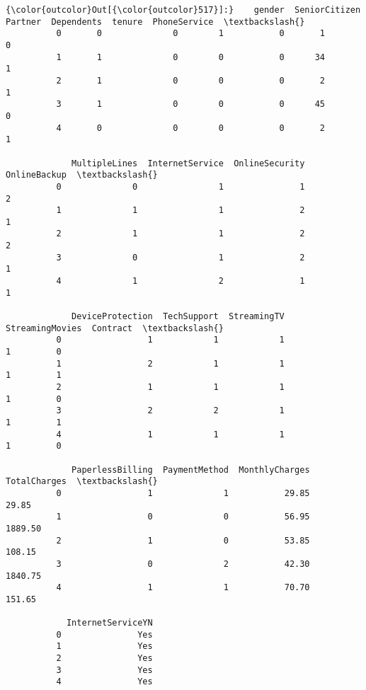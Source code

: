 \documentclass[11pt]{article}
\begin{document}
\begin{Verbatim}[commandchars=\\\{\}]
{\color{outcolor}Out[{\color{outcolor}517}]:}    gender  SeniorCitizen  Partner  Dependents  tenure  PhoneService  \textbackslash{}
          0       0              0        1           0       1             0   
          1       1              0        0           0      34             1   
          2       1              0        0           0       2             1   
          3       1              0        0           0      45             0   
          4       0              0        0           0       2             1   
          
             MultipleLines  InternetService  OnlineSecurity  OnlineBackup  \textbackslash{}
          0              0                1               1             2   
          1              1                1               2             1   
          2              1                1               2             2   
          3              0                1               2             1   
          4              1                2               1             1   
          
             DeviceProtection  TechSupport  StreamingTV  StreamingMovies  Contract  \textbackslash{}
          0                 1            1            1                1         0   
          1                 2            1            1                1         1   
          2                 1            1            1                1         0   
          3                 2            2            1                1         1   
          4                 1            1            1                1         0   
          
             PaperlessBilling  PaymentMethod  MonthlyCharges  TotalCharges  \textbackslash{}
          0                 1              1           29.85         29.85   
          1                 0              0           56.95       1889.50   
          2                 1              0           53.85        108.15   
          3                 0              2           42.30       1840.75   
          4                 1              1           70.70        151.65   
          
            InternetServiceYN  
          0               Yes  
          1               Yes  
          2               Yes  
          3               Yes  
          4               Yes  
\end{Verbatim}
            
\end{document}
